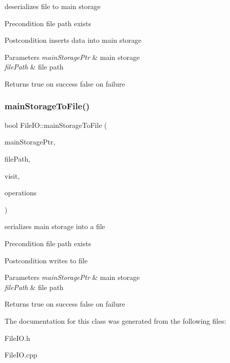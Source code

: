 deserializes file to main storage \begin{DoxyPrecond}{Precondition}
file path exists 
\end{DoxyPrecond}
\begin{DoxyPostcond}{Postcondition}
inserts data into main storage 
\end{DoxyPostcond}

\begin{DoxyParams}{Parameters}
{\em main\+Storage\+Ptr} & main storage \\
\hline
{\em file\+Path} & file path \\
\hline
\end{DoxyParams}
\begin{DoxyReturn}{Returns}
true on success false on failure 
\end{DoxyReturn}
\mbox{\label{class_file_i_o_a7869794d3446ce408a9a8248921e6d5a}} 
\subsubsection{\texorpdfstring{main\+Storage\+To\+File()}{mainStorageToFile()}}
{\footnotesize\ttfamily bool File\+I\+O\+::main\+Storage\+To\+File (\begin{DoxyParamCaption}\item[{\hyperlink{class_main_storage}{Main\+Storage} $\ast$}]{main\+Storage\+Ptr,  }\item[{std\+::string}]{file\+Path,  }\item[{std\+::function$<$ void(\hyperlink{class_main_storage_node}{Main\+Storage\+Node} $\ast$)$>$ $\ast$}]{visit,  }\item[{unsigned int \&}]{operations }\end{DoxyParamCaption})\hspace{0.3cm}{\ttfamily [static]}}

serializes main storage into a file \begin{DoxyPrecond}{Precondition}
file path exists 
\end{DoxyPrecond}
\begin{DoxyPostcond}{Postcondition}
writes to file 
\end{DoxyPostcond}

\begin{DoxyParams}{Parameters}
{\em main\+Storage\+Ptr} & main storage \\
\hline
{\em file\+Path} & file path \\
\hline
\end{DoxyParams}
\begin{DoxyReturn}{Returns}
true on success false on failure 
\end{DoxyReturn}


The documentation for this class was generated from the following files\+:\begin{DoxyCompactItemize}
\item 
File\+I\+O.\+h\item 
File\+I\+O.\+cpp\end{DoxyCompactItemize}
